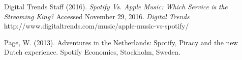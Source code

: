 \documentclass{roffin}
\begin{document}
\vfill

\begin{thebibliography}{}

Digital Trends Staff (2016). \textit{Spotify Vs. Apple Music: Which Service is the Streaming King?}
Accessed November 29, 2016. \textit{Digital Trends} http://www.digitaltrends.com/music/apple-music-vs-spotify/



Page, W. (2013).
Adventures in the Netherlands: Spotify, Piracy and the new Dutch experience.
Spotify Economics, Stockholm, Sweden.


\end{thebibliography}
\end{document}
